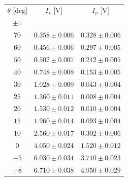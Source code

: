 \documentclass[10pt,oneside,a4paper]{article}
\newenvironment{Figure}
  {\par\medskip\noindent\minipage{\linewidth}}
  {\endminipage\par\medskip}
\begin{document}
\begin{table}[H]
\centering
{}
\label{tab:brewster}
\begin{tabular}{ccc}
\hline
 $\theta$ [deg]& $I_s$ [V]&$I_p$ [V]\\
 $\pm 1$ & &\\
\hline
   $  70$&  $ 0.358 \pm 0.006   $&$ 0.328 \pm 0.006 $\\
   $ 60 $&  $ 0.456 \pm 0.006   $&$ 0.297 \pm 0.005 $\\
   $ 50 $&  $ 0.502 \pm 0.007   $&$ 0.242 \pm 0.005 $\\
   $ 40 $&  $ 0.748 \pm 0.008   $&$ 0.153 \pm 0.005 $\\
   $ 30 $&  $ 1.028 \pm 0.009   $&$ 0.043 \pm 0.004 $\\
   $ 25 $&  $ 1.360 \pm 0.011    $&$ 0.008 \pm 0.004 $\\
   $ 20 $&  $ 1.530 \pm 0.012   $&$ 0.010 \pm 0.004 $\\
   $ 15 $&  $ 1.960 \pm 0.014   $&$ 0.093 \pm 0.004 $\\
   $ 10 $&  $ 2.560 \pm 0.017   $&$ 0.302 \pm 0.006 $\\
   $  0 $&  $ 4.050 \pm 0.024   $&$ 1.520 \pm 0.012 $\\
   $ -5 $&  $ 6.030 \pm 0.034   $&$ 3.710 \pm 0.023 $\\
   $ -8 $&  $ 6.710 \pm 0.038  $&$ 4.950 \pm 0.029 $\\
\hline
\end{tabular}
\end{table}






\end{document}
